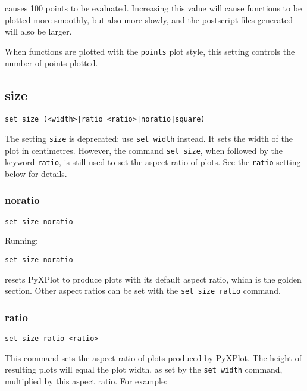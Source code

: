 \noindent causes 100 points to be evaluated.  Increasing this value will cause
functions to be plotted more smoothly, but also more slowly, and the postscript
files generated will also be larger.

When functions are plotted with the {\tt points} plot style, this setting
controls the number of points plotted.

\subsection{size}

\begin{verbatim}
set size (<width>|ratio <ratio>|noratio|square)
\end{verbatim}

The setting {\tt size} is deprecated: use {\tt set width} instead.  It sets the
width of the plot in centimetres. However, the command {\tt set size}, when
followed by the keyword {\tt ratio}, is still used to set the aspect ratio of
plots. See the {\tt ratio} setting below for details.

\subsubsection{noratio}

\begin{verbatim}
set size noratio
\end{verbatim}

Running:

\begin{verbatim}
set size noratio
\end{verbatim}

\noindent resets PyXPlot to produce plots with its default aspect ratio, which is the
golden section. Other aspect ratios can be set with the {\tt set size ratio}
command.


\subsubsection{ratio}

\begin{verbatim}
set size ratio <ratio>
\end{verbatim}

This command sets the aspect ratio of plots produced by PyXPlot.  The height of
resulting plots will equal the plot width, as set by the {\tt set width}
command, multiplied by this aspect ratio.  For example:

